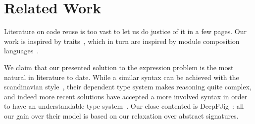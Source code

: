 \saveSpace\saveSpace
\section{Related Work}
\saveSpace\saveSpace
Literature on code reuse is too vast to let us do justice of it in a few pages.
Our work is inspired by traits~\cite{ducasse2006traits}, which in turn
are inspired by module composition languages~\cite{ancona2002calculus}.

We claim that our presented solution to the expression problem is the most natural in literature to date.
While a similar syntax can be achieved with the scandinavian style~\cite{ernst2004expression}, their dependent type system makes reasoning quite complex, and indeed more recent solutions have accepted a more involved syntax in order to have an understandable type system~\cite{igarashi2005lightweight}.
Our close contented is DeepFJig~\cite{corradi2011deepfjig}: all our gain over their model is based on our relaxation over abstract signatures.


\saveSpace
